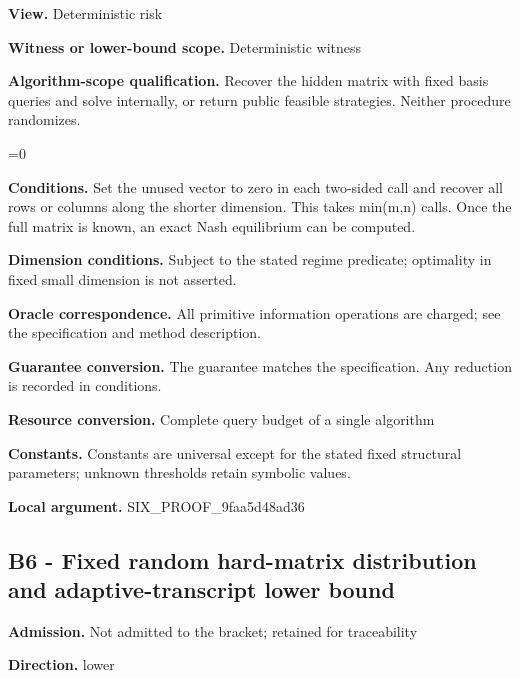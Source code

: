 \documentclass[10pt,a4paper]{article}
\newcommand{\AtlasMath}[1]{\par\begingroup\centering\setbox0=\hbox{$\displaystyle #1$}\ifdim\wd0>1.4\linewidth\typeout{ATLAS WIDE FORMULA: \the\wd0}\fi\ifdim\wd0>\linewidth\resizebox{\linewidth}{!}{\box0}\else\box0\fi\par\endgroup}
\begin{document}
\textbf{View.} Deterministic risk



\textbf{Witness or lower-bound scope.} Deterministic witness



\textbf{Algorithm-scope qualification.} Recover the hidden matrix with fixed basis queries and solve internally, or return public feasible strategies. Neither procedure randomizes.



\AtlasMath{0}


\textbf{Conditions.} Set the unused vector to zero in each two-sided call and recover all rows or columns along the shorter dimension. This takes min(m,n) calls. Once the full matrix is known, an exact Nash equilibrium can be computed.



\textbf{Dimension conditions.} Subject to the stated regime predicate; optimality in fixed small dimension is not asserted.



\textbf{Oracle correspondence.} All primitive information operations are charged; see the specification and method description.



\textbf{Guarantee conversion.} The guarantee matches the specification. Any reduction is recorded in conditions.



\textbf{Resource conversion.} Complete query budget of a single algorithm



\textbf{Constants.} Constants are universal except for the stated fixed structural parameters; unknown thresholds retain symbolic values.



\textbf{Local argument.} SIX\_PROOF\_9faa5d48ad36



\subsection{B6 - Fixed random hard-matrix distribution and adaptive-transcript lower bound}


\textbf{Admission.} Not admitted to the bracket; retained for traceability



\textbf{Direction.} lower
\end{document}
